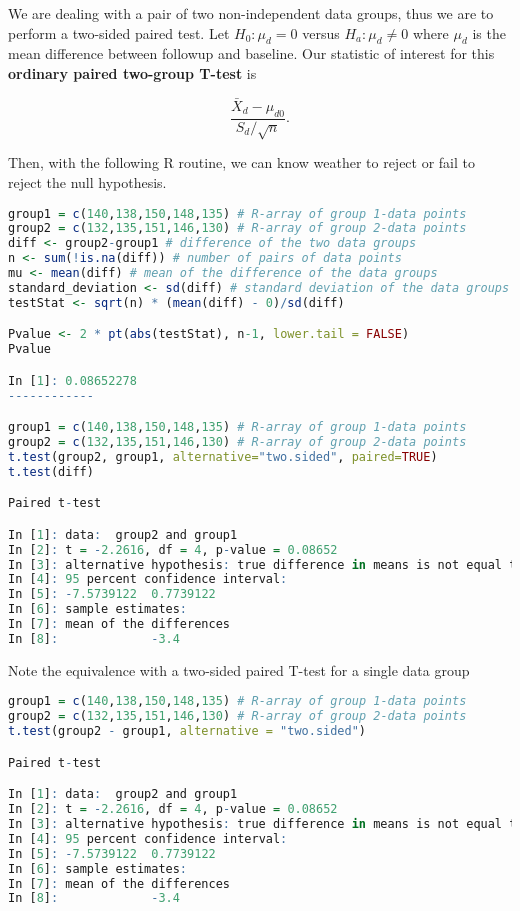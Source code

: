 \documentclass{homework}
\begin{document}
We are dealing with a pair of two non-independent data groups, thus we are to perform a two-sided paired test. Let $H_0: \mu_d = 0$ versus $H_a: \mu_d \neq 0$ where $\mu_d$ is the mean difference between followup and baseline. Our statistic of interest for this \textbf{ordinary paired two-group T-test} is 

$$
\frac{\bar{X}_d - \mu_{d0}}{S_d/\sqrt{n}}.
$$

Then, with the following R routine, we can know weather to reject or fail to reject the null hypothesis.

\begin{lstlisting}[language=R]
group1 = c(140,138,150,148,135) # R-array of group 1-data points
group2 = c(132,135,151,146,130) # R-array of group 2-data points
diff <- group2-group1 # difference of the two data groups
n <- sum(!is.na(diff)) # number of pairs of data points
mu <- mean(diff) # mean of the difference of the data groups
standard_deviation <- sd(diff) # standard deviation of the data groups 
testStat <- sqrt(n) * (mean(diff) - 0)/sd(diff) 

Pvalue <- 2 * pt(abs(testStat), n-1, lower.tail = FALSE) 
Pvalue

In [1]: 0.08652278
------------

group1 = c(140,138,150,148,135) # R-array of group 1-data points
group2 = c(132,135,151,146,130) # R-array of group 2-data points
t.test(group2, group1, alternative="two.sided", paired=TRUE)
t.test(diff)

Paired t-test

In [1]: data:  group2 and group1
In [2]: t = -2.2616, df = 4, p-value = 0.08652
In [3]: alternative hypothesis: true difference in means is not equal to 0
In [4]: 95 percent confidence interval:
In [5]: -7.5739122  0.7739122
In [6]: sample estimates:
In [7]: mean of the differences 
In [8]:             -3.4 
\end{lstlisting}

Note the equivalence with a two-sided paired T-test for a single data group

\begin{lstlisting}[language=R]
group1 = c(140,138,150,148,135) # R-array of group 1-data points
group2 = c(132,135,151,146,130) # R-array of group 2-data points
t.test(group2 - group1, alternative = "two.sided")

Paired t-test

In [1]: data:  group2 and group1
In [2]: t = -2.2616, df = 4, p-value = 0.08652
In [3]: alternative hypothesis: true difference in means is not equal to 0
In [4]: 95 percent confidence interval:
In [5]: -7.5739122  0.7739122
In [6]: sample estimates:
In [7]: mean of the differences 
In [8]:             -3.4 
\end{lstlisting}
\end{document}
